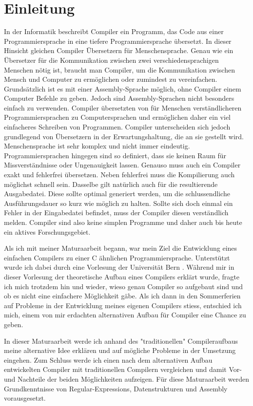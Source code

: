 \chapter{Einleitung}
In der Informatik beschreibt Compiler ein Programm, das Code aus einer Programmiersprache in eine tiefere Programmiersprache übersetzt. In dieser Hinsicht gleichen Compiler Übersetzern für Menschensprache.
Genau wie ein Übersetzer für die Kommunikation zwischen zwei verschiedensprachigen Menschen nötig ist, braucht man Compiler, um die Kommunikation zwischen Mensch und Computer zu ermöglichen oder zumindest zu vereinfachen.
Grundsätzlich ist es mit einer Assembly-Sprache möglich, ohne Compiler einem Computer Befehle zu geben. Jedoch sind Assembly-Sprachen nicht besonders einfach zu verwenden.
Compiler übersetzten von für Menschen verständlicheren Programmiersprachen zu Computersprachen und ermöglichen daher ein viel einfacheres Schreiben von Programmen.
Compiler unterscheiden sich jedoch grundlegend von Übersetzern in der Erwartungshaltung, die an sie gestellt wird. Menschensprache ist sehr komplex und nicht immer eindeutig. 
Programmiersprachen hingegen sind so definiert, dass sie keinen Raum für Missverständnisse oder Ungenauigkeit lassen. Genauso muss auch ein Compiler exakt und fehlerfrei übersetzen.
Neben fehlerfrei muss die Kompilierung auch möglichst schnell sein. Dasselbe gilt natürlich auch für die resultierende Ausgabedatei. Diese sollte optimal generiert werden, um die schlussendliche
Ausführungsdauer so kurz wie möglich zu halten. Sollte sich doch einmal ein Fehler in der Eingabedatei befindet, muss der Compiler diesen verständlich melden. Compiler sind also keine simplen Programme und daher auch bis heute
ein aktives Forschungsgebiet.

Als ich mit meiner Maturaarbeit begann, war mein Ziel die Entwicklung eines einfachen Compilers zu einer C ähnlichen Programmiersprache. Unterstützt wurde ich dabei durch eine Vorlesung der Universität Bern \cite{Lecture}.
Während mir in dieser Vorlesung der theoretische Aufbau eines Compilers erklärt wurde, fragte ich mich trotzdem hin und wieder, wieso genau Compiler so aufgebaut sind und
ob es nicht eine einfachere Möglichkeit gäbe.
Als ich dann in den Sommerferien auf Probleme in der Entwicklung meines eigenen Compilers stiess, entschied ich mich, einem von mir erdachten alternativen Aufbau für Compiler eine Chance zu geben. 

In dieser Maturaarbeit werde ich anhand des "traditionellen"{} Compileraufbaus meine alternative Idee erklären und auf mögliche Probleme in der Umsetzung eingehen.
Zum Schluss werde ich einen nach dem alternativen Aufbau entwickelten Compiler mit traditionellen Compilern vergleichen und damit Vor- und Nachteile der beiden Möglichkeiten aufzeigen.
Für diese Maturaarbeit werden Grundkenntnisse von Regular-Expressions, Datenstrukturen und Assembly vorausgesetzt.

